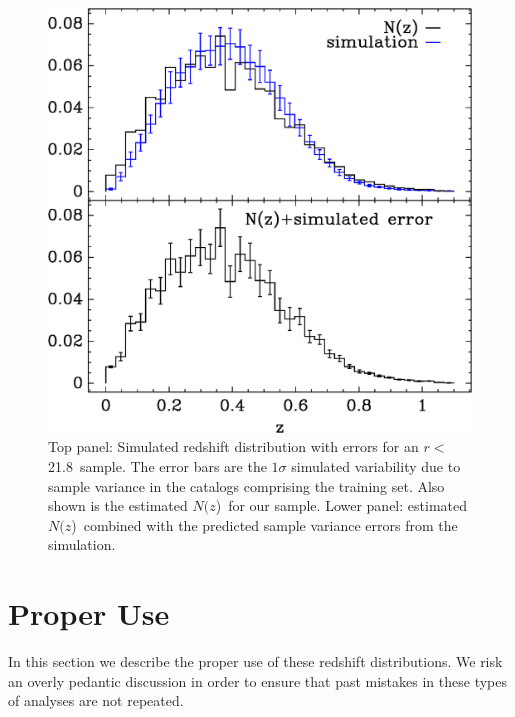\documentclass[preprint]{aastex}
\newcommand{\rmax}{21.8}
\newcommand{\nofz}{$N(z$)}
\begin{document}
\begin{figure}[t]\centering
    \includegraphics[scale=0.6]{figures/nzsigf-edges-12-nofz-sim-errors-2panel.eps}

    \caption{Top panel: Simulated redshift distribution with errors for an
    $r<$ \rmax\ sample.  The error bars are the $1 \sigma$ simulated
    variability due to sample variance in the catalogs comprising the training
    set.  Also shown is the estimated \nofz\ for our sample.  Lower panel:
    estimated \nofz\ combined with the predicted sample variance errors from
    the simulation.}

    \label{fig:ebars}
    \vspace{2em}
\end{figure}



\section{Proper Use} \label{sec:usage}

In this section we describe the proper use of these redshift distributions.
We risk an overly pedantic discussion in order to ensure that past
mistakes in these types of analyses are not repeated.
\end{document}
